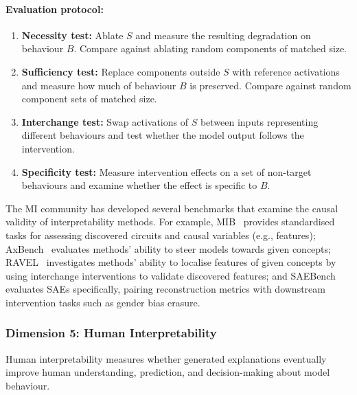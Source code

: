 \paragraph{Evaluation protocol:}
\begin{enumerate}
\item \textbf{Necessity test:} Ablate \(S\) and measure the resulting degradation on behaviour \(B\). Compare against ablating random components of matched size.
\item \textbf{Sufficiency test:} Replace components outside \(S\) with reference activations and measure how much of behaviour \(B\) is preserved. Compare against random component sets of matched size.
\item \textbf{Interchange test:} Swap activations of \(S\) between inputs representing different behaviours and test whether the model output follows the intervention.
\item \textbf{Specificity test:} Measure intervention effects on a set of non-target behaviours and examine whether the effect is specific to \(B\).
\end{enumerate}

The MI community has developed several benchmarks that examine the causal validity of interpretability methods. For example, MIB~ provides standardised tasks for assessing discovered circuits and causal variables (e.g., features); AxBench~ evaluates methods’ ability to steer models towards given concepts; RAVEL~ investigates methods’ ability to localise features of given concepts by using interchange interventions to validate discovered features; and SAEBench~ evaluates SAEs specifically,
pairing reconstruction metrics with downstream intervention tasks such as gender bias erasure.

\subsubsection*{Dimension 5: Human Interpretability}
Human interpretability measures whether generated explanations eventually improve human understanding, prediction, and decision-making about model behaviour.

